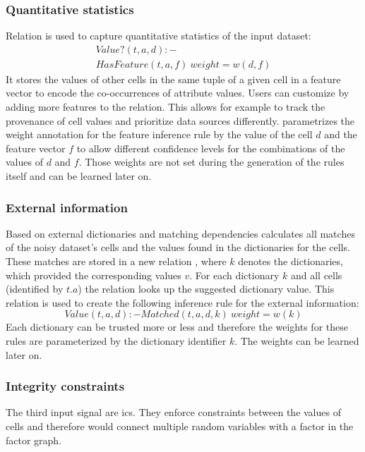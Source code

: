   \subsubsection*{Quantitative statistics}
  Relation  is used to capture quantitative statistics of the input dataset:
  \begin{multline}
    Value?(t,a,d):-\\HasFeature(t,a,f)\ weight=w(d,f)\label{equ:statistics}
  \end{multline}
  It stores the values of other cells in the same tuple of a given cell in a feature vector to encode the co-occurrences of attribute values.
  Users can customize \holoclean{} by adding more features to the  relation.
  This allows for example to track the provenance of cell values and prioritize data sources differently.
  \holoclean{} parametrizes the weight annotation for the feature inference rule by the value of the cell $d$ and the feature vector $f$ to allow different confidence levels for the combinations of the values of $d$ and $f$.
  Those weights are not set during the generation of the rules itself and can be learned later on.
    
  \subsubsection*{External information}
  Based on external dictionaries and matching dependencies \holoclean{} calculates all matches of the noisy dataset's cells and the values found in the dictionaries for the cells.
  These matches are stored in a new relation , where $k$ denotes the dictionaries, which provided the corresponding values $v$.
  For each dictionary $k$ and all cells (identified by $t.a$) the relation  looks up the suggested dictionary value.
  This relation is used to create the following inference rule for the external information:
  \begin{equation}
    Value(t,a,d):-Matched(t,a,d,k)\ weight=w(k)\label{equ:matching}
  \end{equation}
  Each dictionary can be trusted more or less and therefore the weights for these rules are parameterized by the dictionary identifier $k$.
  The weights can be learned later on.

  \subsubsection*{Integrity constraints}
  The third input signal are \glspl{ic}.
  They enforce constraints between the values of cells and therefore would connect multiple random variables with a factor in the factor graph.
  
